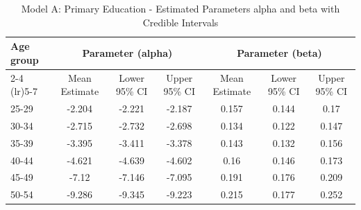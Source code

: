 \begin{landscape}
\begin{table}[htbp]
\centering
\caption{Model A: Primary Education - Estimated Parameters alpha and beta with Credible Intervals}
\label{tab:Fparameters_ab2}
\begin{tabular}{@{}lcccccc@{}}
\toprule
Age group & \multicolumn{3}{c}{Parameter (alpha)} & \multicolumn{3}{c}{Parameter (beta)} \\ 
\cmidrule(lr){2-4} \cmidrule(lr){5-7}
          & Mean Estimate & Lower 95\% CI & Upper 95\% CI & Mean Estimate & Lower 95\% CI & Upper 95\% CI \\ 
\midrule
25-29 & -2.204 & -2.221 & -2.187 & 0.157 & 0.144 & 0.17 \\
30-34 & -2.715 & -2.732 & -2.698 & 0.134 & 0.122 & 0.147 \\
35-39 & -3.395 & -3.411 & -3.378 & 0.143 & 0.132 & 0.156 \\
40-44 & -4.621 & -4.639 & -4.602 & 0.16 & 0.146 & 0.173 \\
45-49 & -7.12 & -7.146 & -7.095 & 0.191 & 0.176 & 0.209 \\
50-54 & -9.286 & -9.345 & -9.223 & 0.215 & 0.177 & 0.252 \\
\bottomrule
\end{tabular}
\end{table}
\end{landscape}